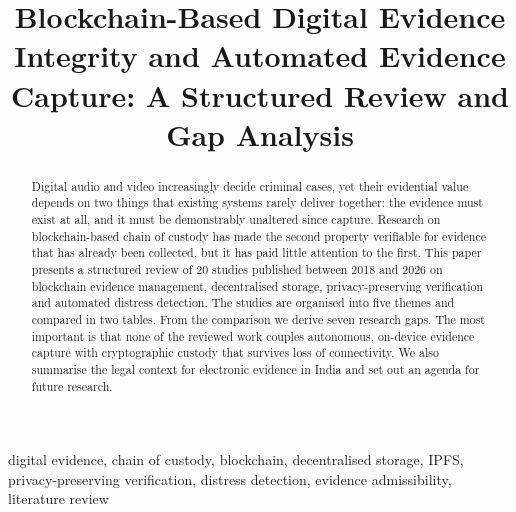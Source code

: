 \documentclass[conference,a4paper,10pt]{IEEEtran}
\begin{document}
\title{Blockchain-Based Digital Evidence Integrity and Automated Evidence Capture: A Structured Review and Gap Analysis}

\author{
\and
{}
}

\maketitle

\begin{abstract}
Digital audio and video increasingly decide criminal cases, yet their evidential value depends on two things that existing systems rarely deliver together: the evidence must exist at all, and it must be demonstrably unaltered since capture. Research on blockchain-based chain of custody has made the second property verifiable for evidence that has already been collected, but it has paid little attention to the first. This paper presents a structured review of 20 studies published between 2018 and 2026 on blockchain evidence management, decentralised storage, privacy-preserving verification and automated distress detection. The studies are organised into five themes and compared in two tables. From the comparison we derive seven research gaps. The most important is that none of the reviewed work couples autonomous, on-device evidence capture with cryptographic custody that survives loss of connectivity. We also summarise the legal context for electronic evidence in India and set out an agenda for future research.
\end{abstract}

\begin{IEEEkeywords}
digital evidence, chain of custody, blockchain, decentralised storage, IPFS, privacy-preserving verification, distress detection, evidence admissibility, literature review
\end{IEEEkeywords}
\end{document}
